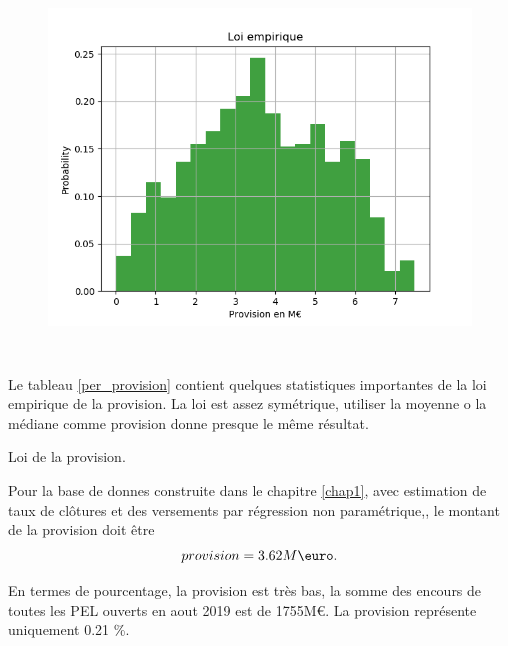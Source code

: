 \documentclass[12pt, a4paper]{book}
\begin{document}
\begin{figure}[!h]
\label{loi_empirique}
\centering
\includegraphics[height=10cm,width=16cm]{loi_empirique.png}
\end{figure}
Le tableau \ref{per_provision} contient quelques statistiques importantes de la loi empirique de la provision. La loi est assez symétrique, utiliser la moyenne o la médiane comme provision donne presque le même résultat. 
\begin{table}[h!]
	\caption{Loi de la provision.}
	\bigskip	
	\label{per_provision}
	\centering
\end{table}

Pour la base de donnes construite dans le chapitre \ref{chap1}, avec estimation de taux de clôtures et des versements par régression non paramétrique,, le montant de la provision doit être
$$ provision = 3.62M\mbox{\euro}.$$

En termes de pourcentage, la provision est très bas, la somme des encours de toutes les PEL ouverts en aout 2019 est de 1755M\euro. La provision représente uniquement 0.21 \%.
\end{document}
